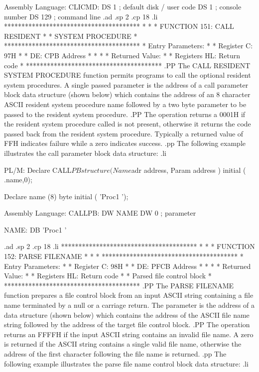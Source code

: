     Assembly Language:
        CLICMD:
        	DS	1	; default disk / user code
        	DS	1	; console number
        	DS	129	; command line
.ad
.sp 2
.cp 18
.li
***************************************
*                                     *
*  FUNCTION 151:  CALL RESIDENT       *
*                 SYSTEM PROCEDURE    *
***************************************
*  Entry Parameters:                  *
*      Register   C:  97H             *
*                DE:  CPB Address     *
*                                     *
*  Returned   Value:                  *
*      Registers HL:  Return code     *
***************************************
.PP
The CALL RESIDENT SYSTEM PROCEDURE function
permits programs to call the optional resident system procedures.
A single passed parameter is the address of a call parameter
block data structure (shown below) which contains the address of an 8 character ASCII
resident
system procedure name followed by a two byte parameter to be passed
to the resident system procedure.
.PP
The operation returns a 0001H if the resident system procedure called
is not present, otherwise it returns the code passed back from
the resident system procedure.  Typically a returned value of FFH
indicates failure while a zero indicates success.
.pp
The following example illustrates the call parameter block data
structure:
.li

    PL/M:
        Declare CALL$PB structure (
          Name$adr address,
        Param address ) initial (
          .name,0);

        Declare name (8) byte initial (
          'Proc1   ');

    Assembly Language:
        CALLPB:
        	DW	NAME
        	DW	0	; parameter

        NAME:
        	DB	'Proc1   '

.ad
.sp 2
.cp 18
.li
***************************************
*                                     *
*  FUNCTION 152:  PARSE FILENAME      *
*                                     *
***************************************
*  Entry Parameters:                  *
*      Register   C:  98H             *
*                DE:  PFCB Address    *
*                                     *
*  Returned   Value:                  *
*      Registers HL:  Return code     *
*      Parsed file control block      *
***************************************
.PP
The PARSE FILENAME function prepares a file
control block from an input ASCII string containing a file name
terminated by a null or a carriage return.
The parameter is the address of a data structure (shown below) which contains
the address of the ASCII file name string followed by the address of
the target file control block.
.PP
The operation returns an FFFFH if the input ASCII string contains an
invalid file name.  A zero is returned if the ASCII string contains
a single valid file name, otherwise the address of the first character
following the file name is returned.
.pp
The following example illustrates the parse file name control block
data structure:
.li

